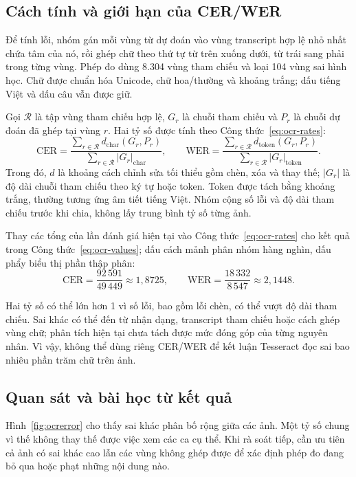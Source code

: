 \documentclass[11pt,a4paper]{article}
\begin{document}
\subsection{Cách tính và giới hạn của CER/WER}
Để tính lỗi, nhóm gán mỗi vùng từ dự đoán vào vùng transcript hợp lệ nhỏ nhất chứa tâm của nó, rồi ghép chữ theo thứ tự từ trên xuống dưới, từ trái sang phải trong từng vùng. Phép đo dùng 8.304 vùng tham chiếu và loại 104 vùng sai hình học. Chữ được chuẩn hóa Unicode, chữ hoa/thường và khoảng trắng; dấu tiếng Việt và dấu câu vẫn được giữ.

Gọi $\mathcal{R}$ là tập vùng tham chiếu hợp lệ, $G_r$ là chuỗi tham chiếu và $P_r$ là chuỗi dự đoán đã ghép tại vùng $r$. Hai tỷ số được tính theo Công thức~\eqref{eq:ocr-rates}:
\begin{equation}\label{eq:ocr-rates}
\mathrm{CER}=\frac{\sum_{r\in\mathcal{R}}d_{\mathrm{char}}(G_r,P_r)}{\sum_{r\in\mathcal{R}}|G_r|_{\mathrm{char}}},
\qquad
\mathrm{WER}=\frac{\sum_{r\in\mathcal{R}}d_{\mathrm{token}}(G_r,P_r)}{\sum_{r\in\mathcal{R}}|G_r|_{\mathrm{token}}}.
\end{equation}
Trong đó, $d$ là khoảng cách chỉnh sửa tối thiểu gồm chèn, xóa và thay thế; $|G_r|$ là độ dài chuỗi tham chiếu theo ký tự hoặc token. Token được tách bằng khoảng trắng, thường tương ứng âm tiết tiếng Việt. Nhóm cộng số lỗi và độ dài tham chiếu trước khi chia, không lấy trung bình tỷ số từng ảnh.

Thay các tổng của lần đánh giá hiện tại vào Công thức~\eqref{eq:ocr-rates} cho kết quả trong Công thức~\eqref{eq:ocr-values}; dấu cách mảnh phân nhóm hàng nghìn, dấu phẩy biểu thị phần thập phân:
\begin{equation}\label{eq:ocr-values}
\mathrm{CER}=\frac{92\,591}{49\,449}\approx1{,}8725,
\qquad
\mathrm{WER}=\frac{18\,332}{8\,547}\approx2{,}1448.
\end{equation}

Hai tỷ số có thể lớn hơn 1 vì số lỗi, bao gồm lỗi chèn, có thể vượt độ dài tham chiếu. Sai khác có thể đến từ nhận dạng, transcript tham chiếu hoặc cách ghép vùng chữ; phân tích hiện tại chưa tách được mức đóng góp của từng nguyên nhân. Vì vậy, không thể dùng riêng CER/WER để kết luận Tesseract đọc sai bao nhiêu phần trăm chữ trên ảnh.

\subsection{Quan sát và bài học từ kết quả}
Hình~\ref{fig:ocrerror} cho thấy sai khác phân bố rộng giữa các ảnh. Một tỷ số chung vì thế không thay thế được việc xem các ca cụ thể. Khi rà soát tiếp, cần ưu tiên cả ảnh có sai khác cao lẫn các vùng không ghép được để xác định phép đo đang bỏ qua hoặc phạt những nội dung nào.
\end{document}
